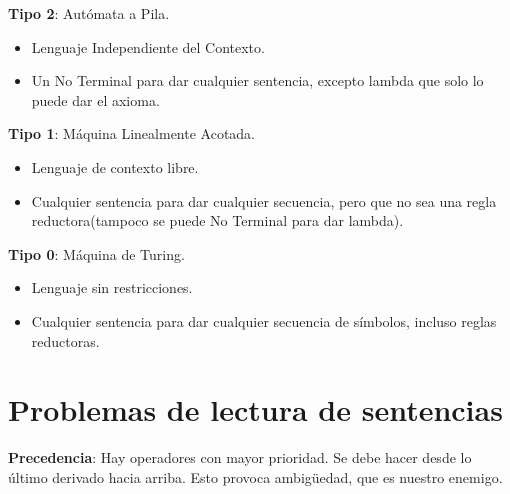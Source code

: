 \documentclass[12pt, twoside, openright]{report} %
\begin{document}
\textbf{Tipo 2}: Autómata a Pila.

\begin{itemize}
	\item Lenguaje Independiente del Contexto.
	\item Un No Terminal para dar cualquier sentencia, excepto lambda que solo
	      lo puede dar el axioma.
\end{itemize}

\textbf{Tipo 1}: Máquina Linealmente Acotada.

\begin{itemize}
	\item Lenguaje de contexto libre.
	\item Cualquier sentencia para dar cualquier secuencia, pero que no sea una
	      regla reductora(tampoco se puede No Terminal para dar lambda).
\end{itemize}

\textbf{Tipo 0}: Máquina de Turing.

\begin{itemize}
	\item Lenguaje sin restricciones.
	\item Cualquier sentencia para dar cualquier secuencia de símbolos, incluso
	      reglas reductoras.
\end{itemize}

\section{Problemas de lectura de sentencias}

\textbf{Precedencia}: Hay operadores con mayor prioridad. Se debe hacer
desde lo último derivado hacia arriba. Esto provoca ambigüedad, que es
nuestro enemigo.
\end{document}
